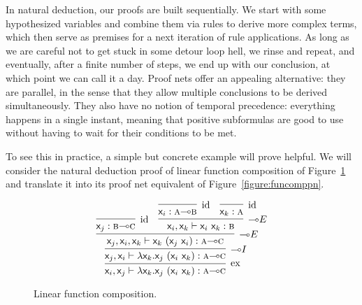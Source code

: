 In natural deduction, our proofs are built sequentially.
We start with some hypothesized variables and combine them via rules to derive more complex terms, which then serve as premises for a next iteration of rule applications.
As long as we are careful not to get stuck in some detour loop hell, we rinse and repeat, and eventually, after a finite number of steps, we end up with our conclusion, at which point we can call it a day.
Proof nets offer an appealing alternative: they are parallel, in the sense that they allow multiple conclusions to be derived simultaneously.
They also have no notion of temporal precedence: everything happens in a single instant, meaning that positive subformulas are good to use without having to wait for their conditions to be met.

To see this in practice, a simple but concrete example will prove helpful.
We will consider the natural deduction proof of linear function composition of Figure~\ref{figure:funcomp} and translate it into its proof net equivalent of Figure~\ref{figure:funcomppn}.

\begin{figure}
	\[
		\infer[\Exchange]{\term{\vari}, \term{\varj} \vdash \term{\lam \vark.\varj~(\vari~\vark)}: \prop{a} \li \prop{c}}{
			\infer[\li I]{\term{\varj}, \term{\vari} \vdash \term{\lam \vark.\varj~(\vari~\vark)}: \prop{a} \li \prop{c}}{
				\infer[\li E]{\term{\varj}, \term{\vari}, \term{\vark} \vdash \term{\vark~(\varj~\vari)}: \prop{a} \li \prop{c}}{
					\infer[\Ax]{\term{\varj}:\prop{b}\li\prop{c}}{}
					&
					\infer[\li E]{\term{\vari}, \term{\vark} \vdash \term{\vari~\vark}: \prop{b}}{
						\infer[\Ax]{\term{\vari}: \prop{a}\li\prop{b}}{}
						&
						\infer[\Ax]{\term{\vark}: \prop{a}}{}
					}
				}
			}
		}
	\]
	\caption{Linear function composition.}
	\label{figure:funcomp}
\end{figure}

